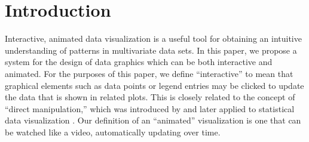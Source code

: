 \documentclass[12pt]{article}\usepackage[]{graphicx}\usepackage[]{color}
\begin{document}
\section{Introduction}




Interactive, animated data visualization is a useful tool for
obtaining an intuitive understanding of patterns in multivariate data
sets. In this paper, we propose a system for the design of data
graphics which can be both interactive and animated. For the purposes
of this paper, we define ``interactive'' to mean that graphical
elements such as data points or legend entries may be clicked to update the data that is
shown in related plots. This is closely related to the concept of
``direct manipulation,'' which was introduced by \citet{shneiderman82}
and later applied to statistical data visualization
\citep{Hutchins:1985, brushing-scatterplots, cleveland}. Our
definition of an ``animated'' visualization is one that can be watched
like a video, automatically updating over time.

\end{document}
